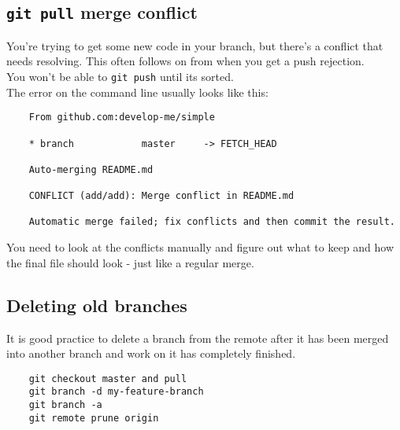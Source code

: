 \subsection{ \texttt{git pull} merge conflict}

You’re trying to get some new code in your branch, but there’s a conflict that needs resolving. This often follows on from when you get a push rejection.
\\

You won’t be able to \texttt{git push} until its sorted.
\\

The error on the command line usually looks like this:

\begin{verbatim}
    From github.com:develop-me/simple

    * branch            master     -> FETCH_HEAD
     
    Auto-merging README.md

    CONFLICT (add/add): Merge conflict in README.md

    Automatic merge failed; fix conflicts and then commit the result.
\end{verbatim}

You need to look at the conflicts manually and figure out what to keep and how the final file should look - just like a regular merge.
\\


\subsection{Deleting old branches}

It is good practice to delete a branch from the remote after it has been merged into another branch and work on it has completely finished.

\begin{verbatim}
    git checkout master and pull
    git branch -d my-feature-branch
    git branch -a
    git remote prune origin
\end{verbatim}
